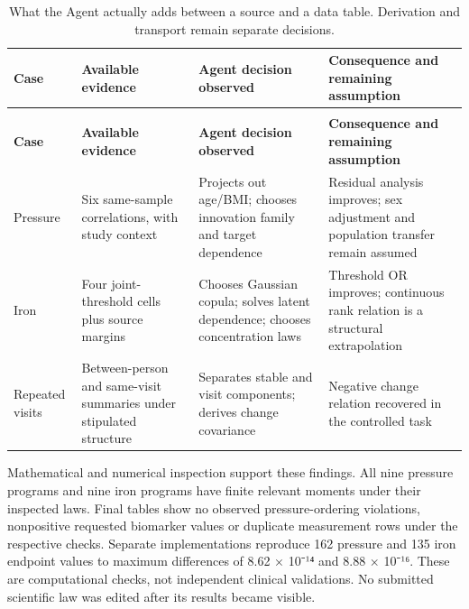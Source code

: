 \documentclass[11pt,letterpaper]{article}
\begin{document}
\begin{xltabular}{\linewidth}{@{}>{\raggedright\arraybackslash}X>{\raggedright\arraybackslash}X>{\raggedright\arraybackslash}X>{\raggedright\arraybackslash}X@{}}

\caption{What the Agent actually adds between a source and a data table. Derivation and transport remain separate decisions.}\label{tab:3} \\

\toprule

\textbf{Case} & \textbf{Available evidence} & \textbf{Agent decision observed} & \textbf{Consequence and remaining assumption} \\

\midrule

\endfirsthead

\\

\toprule

\textbf{Case} & \textbf{Available evidence} & \textbf{Agent decision observed} & \textbf{Consequence and remaining assumption} \\

\midrule

\endhead

\bottomrule

\endfoot

Pressure & Six same-sample correlations, with study context & Projects out age/\allowbreak{}BMI; chooses innovation family and target dependence & Residual analysis improves; sex adjustment and population transfer remain assumed \\

Iron & Four joint-threshold cells plus source margins & Chooses Gaussian copula; solves latent dependence; chooses concentration laws & Threshold OR improves; continuous rank relation is a structural extrapolation \\

Repeated visits & Between-person and same-visit summaries under stipulated structure & Separates stable and visit components; derives change covariance & Negative change relation recovered in the controlled task \\

\end{xltabular}

\endgroup

Mathematical and numerical inspection support these findings. All nine pressure programs and nine iron programs have finite relevant moments under their inspected laws. Final tables show no observed pressure-ordering violations, nonpositive requested biomarker values or duplicate measurement rows under the respective checks. Separate implementations reproduce 162 pressure and 135 iron endpoint values to maximum differences of 8.62 × 10⁻¹⁴ and 8.88 × 10⁻¹⁶. These are computational checks, not independent clinical validations. No submitted scientific law was edited after its results became visible.
\end{document}
